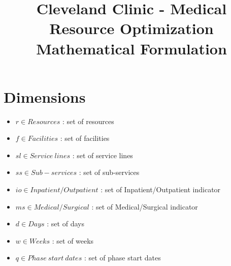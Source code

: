 \documentclass[10pt, letterpaper]{article}
\begin{document}
\title{Cleveland Clinic - Medical Resource Optimization Mathematical Formulation}
\maketitle

\section*{Dimensions}
\begin{itemize}
\item[ ] $ r \in Resources$ : set of resources
\item[ ] $ f \in Facilities$ : set of facilities
\item[ ] $ sl \in Service \ lines$ : set of service lines
\item[ ] $ ss \in Sub-services$ : set of sub-services
\item[ ] $ io \in Inpatient/Outpatient$ : set of Inpatient/Outpatient indicator
\item[ ] $ ms \in Medical/Surgical$ : set of Medical/Surgical indicator
\item[ ] $ d \in Days$ : set of days
\item[ ] $ w \in Weeks$ : set of weeks
\item[ ] $ q \in Phase \ start \ dates$ : set of phase start dates
\end{itemize}
\end{document}
